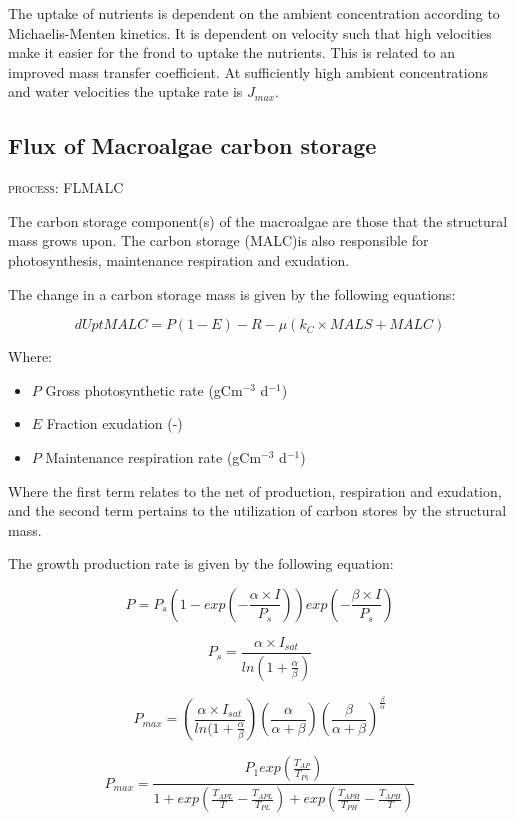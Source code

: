 \documentclass{article}
\begin{document}
The uptake of nutrients is dependent on the ambient concentration according to Michaelis-Menten kinetics. It is dependent on velocity such that high velocities make it easier for the frond to uptake the nutrients. This is related to an improved mass transfer coefficient. At sufficiently high ambient concentrations and water velocities the uptake rate is $J_{max}$.

\subsection{Flux of Macroalgae carbon storage}
\begin{flushright}
\textsc{process: FLMALC}
\end{flushright}

The carbon storage component(s) of the macroalgae are those that the structural mass grows upon. The carbon storage (MALC)is also responsible for photosynthesis, maintenance respiration and exudation. 

The change in a carbon storage mass is given by the following equations:

\[dUptMALC = P(1-E)-R - \mu(k_C \times MALS + MALC)\]

Where:
\begin{itemize}
\item $P$ Gross photosynthetic rate (gCm$^{-3}$ d$^{-1}$)
\item $E$ Fraction exudation (-)
\item $P$ Maintenance respiration rate (gCm$^{-3}$ d$^{-1}$)

\end{itemize}

Where the first term relates to the net of production, respiration and exudation, and the second term pertains to the utilization of carbon stores by the structural mass.

The growth production rate is given by the following equation:

\[P = P_s(1-exp(-\frac{\alpha \times I}{P_s}))exp(-\frac{\beta \times I}{P_s})\]

\[P_s = \frac{\alpha \times I_{sat}}{ln(1+\frac{\alpha}{\beta})}\]

\[P_{max} = (\frac{\alpha \times I_{sat}}{ln(1+\frac{\alpha}{\beta}})(\frac{\alpha}{\alpha+\beta})(\frac{\beta}{\alpha+\beta})^{\frac{\beta}{\alpha}}\]

\[P_{max} = \frac{P_1exp(\frac{T_{AP}}{T_{P1}})}{1+exp(\frac{T_{APL}}{T} - \frac{T_{APL}}{T_{PL}})+exp(\frac{T_{APH}}{T_{PH}}-\frac{T_{APH}}{T})}\]
\end{document}
